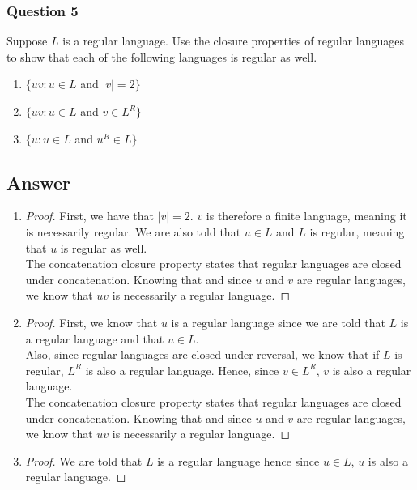 \newpage
\subsubsection*{Question 5}
\noindent[15 pts] Suppose $L$ is a regular language. Use the closure properties of regular languages
to show that each of the following languages is regular as well.
\begin{enumerate}[label={(\alph*)}]
    \item $\{uv : u \in L$ and $|v| = 2 \}$
    \item $\{ uv : u \in L$ and $v \in L^R \}$
    \item $\{ u : u \in L$ and $u^R \in L\}$
\end{enumerate}

\subsection*{Answer}

\begin{enumerate}[label={(\alph*)}]
    \item 
        \begin{proof}
            First, we have that $|v| = 2$. $v$ is therefore a finite language, meaning it is necessarily regular. We are also told that $u \in L$ and $L$ is regular, meaning that $u$ is regular as well.\\
            The concatenation closure property states that regular languages are closed under concatenation. Knowing that and since $u$ and $v$ are regular languages, we know that $uv$ is necessarily a regular language.
        \end{proof}
    \item
        \begin{proof}
            First, we know that $u$ is a regular language since we are told that $L$ is a regular language and that $u \in L$.\\
            Also, since regular languages are closed under reversal, we know that if $L$ is regular, $L^R$ is also a regular language. Hence, since $v \in L^R$, $v$ is also a regular language.\\
            The concatenation closure property states that regular languages are closed under concatenation. Knowing that and since $u$ and $v$ are regular languages, we know that $uv$ is necessarily a regular language.
        \end{proof}
    \item 
        \begin{proof}
            We are told that $L$ is a regular language hence since $u \in L$, $u$ is also a regular language.
        \end{proof}
\end{enumerate}